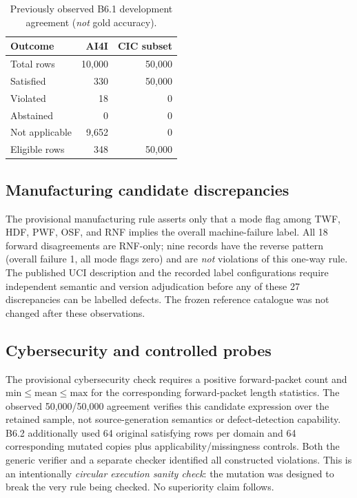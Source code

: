 \documentclass[conference]{IEEEtran}
\begin{document}
\begin{table}[t]
\caption{Previously observed B6.1 development agreement (\emph{not} gold accuracy).}
\label{tab:b61}
\centering\small
\begin{tabular}{lrr}
\toprule
Outcome & AI4I & CIC subset\\
\midrule
Total rows & 10,000 & 50,000\\
Satisfied & 330 & 50,000\\
Violated & 18 & 0\\
Abstained & 0 & 0\\
Not applicable & 9,652 & 0\\
Eligible rows & 348 & 50,000\\
\bottomrule
\end{tabular}
\end{table}

\subsection{Manufacturing candidate discrepancies}
The provisional manufacturing rule asserts only that a mode flag among TWF, HDF, PWF, OSF, and RNF implies the overall machine-failure label. All 18 forward disagreements are RNF-only; nine records have the reverse pattern (overall failure 1, all mode flags zero) and are \emph{not} violations of this one-way rule. The published UCI description and the recorded label configurations require independent semantic and version adjudication before any of these 27 discrepancies can be labelled defects. The frozen reference catalogue was not changed after these observations.

\subsection{Cybersecurity and controlled probes}
The provisional cybersecurity check requires a positive forward-packet count and $\mathrm{min}\leq\mathrm{mean}\leq\mathrm{max}$ for the corresponding forward-packet length statistics. The observed 50,000/50,000 agreement verifies this candidate expression over the retained sample, not source-generation semantics or defect-detection capability. B6.2 additionally used 64 original satisfying rows per domain and 64 corresponding mutated copies plus applicability/missingness controls. Both the generic verifier and a separate checker identified all constructed violations. This is an intentionally \emph{circular execution sanity check}: the mutation was designed to break the very rule being checked. No superiority claim follows.
\end{document}
